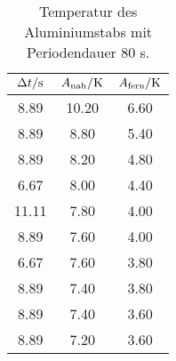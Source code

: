 \begin{table}

	\centering

	\caption{Temperatur des Aluminiumstabs mit Periodendauer 80 s.}


	\begin{tabular}{S[table-format=3.2] S[table-format=3.2]S[table-format=3.2]}

		\toprule

		{$\Delta t/\si[per-mode=reciprocal]{\second}$}&{$A_\text{nah}/\si[per-mode=reciprocal]{\kelvin}$}&{$A_\text{fern}/\si[per-mode=reciprocal]{\kelvin}$} \\

		\midrule

		8.89 & 10.20 & 6.60 \\

		8.89 & 8.80 & 5.40 \\

		8.89 & 8.20 & 4.80 \\

		6.67 & 8.00 & 4.40 \\

		11.11 & 7.80 & 4.00 \\

		8.89 & 7.60 & 4.00 \\

		6.67 & 7.60 & 3.80 \\

		8.89 & 7.40 & 3.80 \\

		8.89 & 7.40 & 3.60 \\

		8.89 & 7.20 & 3.60 \\

		\bottomrule

	\end{tabular}

	\label{tab:tab3}

\end{table}

